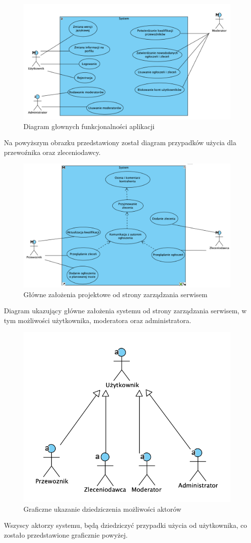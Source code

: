 \begin{figure}[H]
	\centering
		\includegraphics[width=0.9\linewidth]{rozdzial1/ogolny_schemat.png}
	\caption{Diagram głownych funkcjonalności aplikacji}
	\label{Rys. fig:Diagram głownych funkcjonalności aplikacji}
\end{figure}

Na powyższym obrazku przedstawiony został diagram przypadków użycia dla przewoźnika oraz zleceniodawcy. 

\begin{figure}[H]
	\centering
		\includegraphics[width=0.9\linewidth]{rozdzial1/glowne_zalozenia.png}
	\caption{Główne założenia projektowe od strony zarządzania serwisem}
	\label{Rys. fig:Główne założenia projektowe od strony zarządzania serwisem}
\end{figure}

Diagram ukazujący główne założenia systemu od strony zarządzania serwisem, w tym możliwości użytkownika, moderatora oraz administratora.

\begin{figure}[H]
	\centering
		\includegraphics[width=0.6\linewidth]{rozdzial1/dziedziczenie.png}
	\caption{Graficzne ukazanie dziedziczenia możliwości aktorów}
	\label{Rys. fig:Graficzne ukazanie dziedziczenia możliwości aktorów}
\end{figure}

Wszyscy aktorzy systemu, będą dziedziczyć przypadki użycia od użytkownika, co zostało przedstawione graficznie powyżej.